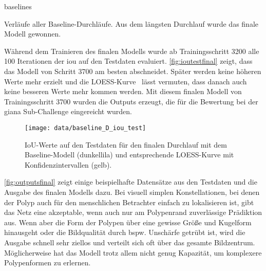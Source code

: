 \begin{losses}{baselines}
	\caption[Verläufe aller Baseline-Durchläufe]{Verläufe aller Baseline-Durchläufe. Aus dem längsten Durchlauf wurde das finale Modell gewonnen.}
	\label{fig:lossbaselineAtoD}
\end{losses}

Während dem Trainieren des finalen Modells wurde ab Trainingsschritt 3200 alle 100 Iterationen der \gls{iou} auf den Testdaten evaluiert.
\autoref{fig:ioutestfinal} zeigt, dass das Modell von Schritt 3700 am besten abschneidet.
Später werden keine höheren Werte mehr erzielt und die LOESS-Kurve~\cite{Cleveland.1992} lässt vermuten, dass danach auch keine besseren Werte mehr kommen werden.
Mit diesem finalen Modell von Trainingsschritt 3700 wurden die Outputs erzeugt, die für die Bewertung bei der \gls{giana} Sub-Challenge eingereicht wurden.

\begin{figure}
	\centering
	\texttt{[image: data/baseline\_D\_iou\_test]}
	\caption[IoU-Werte auf den Testdaten für den finalen Durchlauf mit dem Baseline-Modell und entsprechende LOESS-Kurve mit Konfidenzintervallen]{IoU-Werte auf den Testdaten für den finalen Durchlauf mit dem Baseline-Modell (dunkellila) und entsprechende LOESS-Kurve mit Konfidenzintervallen (gelb).}
	\label{fig:ioutestfinal}
\end{figure}

\autoref{fig:outputsfinal} zeigt einige beispielhafte Datensätze aus den Testdaten und die Ausgabe des finalen Modells dazu.
Bei visuell simplen Konstellationen, bei denen der Polyp auch für den menschlichen Betrachter einfach zu lokalisieren ist, gibt das Netz eine akzeptable, wenn auch nur am Polypenrand zuverlässige Prädiktion aus.
Wenn aber die Form der Polypen über eine gewisse Größe und Kugelform hinausgeht oder die Bildqualität durch bspw. Unschärfe getrübt ist, wird die Ausgabe schnell sehr ziellos und verteilt sich oft über das gesamte Bildzentrum.
Möglicherweise hat das Modell trotz allem nicht genug Kapazität, um komplexere Polypenformen zu erlernen.

